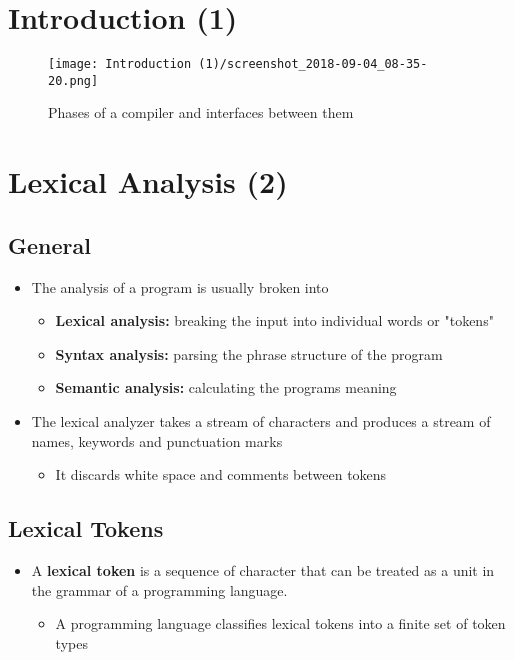 \documentclass[11pt]{article}
\author{Martin Nørskov Jensen}
\date{\today}
\title{}
\begin{document}
\tableofcontents

\section{Introduction (1)}
\label{sec:org7b3051b}
\begin{figure}[htbp]
\centering
\texttt{[image: Introduction (1)/screenshot\_2018-09-04\_08-35-20.png]}
\caption{\label{fig:org56bcff2}
Phases of a compiler and interfaces between them}
\end{figure}

\section{Lexical Analysis (2)}
\label{sec:org384e16c}
\subsection{General}
\label{sec:orgdd2482c}
\begin{itemize}
\item The analysis of a program is usually broken into
\begin{itemize}
\item \textbf{Lexical analysis:} breaking the input into individual words or "tokens"
\item \textbf{Syntax analysis:} parsing the phrase structure of the program
\item \textbf{Semantic analysis:} calculating the programs meaning
\end{itemize}

\item The lexical analyzer takes a stream of characters and produces a stream of names, keywords and punctuation marks
\begin{itemize}
\item It discards white space and comments between tokens
\end{itemize}
\end{itemize}

\subsection{Lexical Tokens}
\label{sec:org5054e00}
\begin{itemize}
\item A \textbf{lexical token} is a sequence of character that can be treated as a unit in the grammar of a programming language.
\begin{itemize}
\item A programming language classifies lexical tokens into a finite set of token types
\end{itemize}
\end{itemize}
\end{document}
